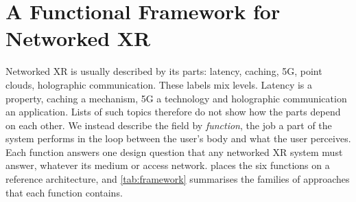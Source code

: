 \section{A Functional Framework for Networked XR}\label{sec:framework}

Networked XR is usually described by its parts: latency, caching, 5G, point clouds, holographic
communication. These labels mix levels. Latency is a property, caching a mechanism, 5G a technology and
holographic communication an application. Lists of such topics therefore do not show how the parts
depend on each other. We instead describe the field by \emph{function}, the job a part of the system
performs in the loop between the user's body and what the user perceives. Each function answers one
design question that any networked XR system must answer, whatever its medium or access network.
 places the six functions on a reference architecture, and \cref{tab:framework}
summarises the families of approaches that each function contains.

